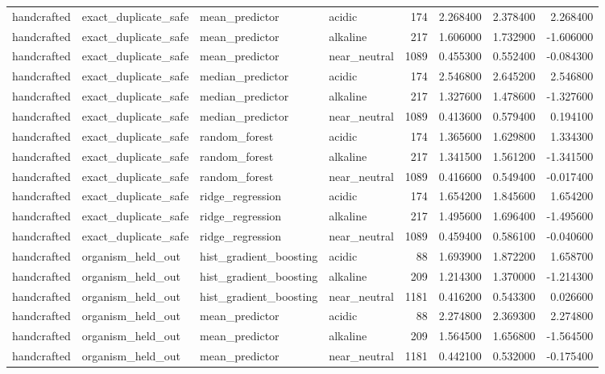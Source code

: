 \begin{longtable}{llllrrrr}
handcrafted & exact\_duplicate\_safe & mean\_predictor & acidic & 174 & 2.268400 & 2.378400 & 2.268400 \\
handcrafted & exact\_duplicate\_safe & mean\_predictor & alkaline & 217 & 1.606000 & 1.732900 & -1.606000 \\
handcrafted & exact\_duplicate\_safe & mean\_predictor & near\_neutral & 1089 & 0.455300 & 0.552400 & -0.084300 \\
handcrafted & exact\_duplicate\_safe & median\_predictor & acidic & 174 & 2.546800 & 2.645200 & 2.546800 \\
handcrafted & exact\_duplicate\_safe & median\_predictor & alkaline & 217 & 1.327600 & 1.478600 & -1.327600 \\
handcrafted & exact\_duplicate\_safe & median\_predictor & near\_neutral & 1089 & 0.413600 & 0.579400 & 0.194100 \\
handcrafted & exact\_duplicate\_safe & random\_forest & acidic & 174 & 1.365600 & 1.629800 & 1.334300 \\
handcrafted & exact\_duplicate\_safe & random\_forest & alkaline & 217 & 1.341500 & 1.561200 & -1.341500 \\
handcrafted & exact\_duplicate\_safe & random\_forest & near\_neutral & 1089 & 0.416600 & 0.549400 & -0.017400 \\
handcrafted & exact\_duplicate\_safe & ridge\_regression & acidic & 174 & 1.654200 & 1.845600 & 1.654200 \\
handcrafted & exact\_duplicate\_safe & ridge\_regression & alkaline & 217 & 1.495600 & 1.696400 & -1.495600 \\
handcrafted & exact\_duplicate\_safe & ridge\_regression & near\_neutral & 1089 & 0.459400 & 0.586100 & -0.040600 \\
handcrafted & organism\_held\_out & hist\_gradient\_boosting & acidic & 88 & 1.693900 & 1.872200 & 1.658700 \\
handcrafted & organism\_held\_out & hist\_gradient\_boosting & alkaline & 209 & 1.214300 & 1.370000 & -1.214300 \\
handcrafted & organism\_held\_out & hist\_gradient\_boosting & near\_neutral & 1181 & 0.416200 & 0.543300 & 0.026600 \\
handcrafted & organism\_held\_out & mean\_predictor & acidic & 88 & 2.274800 & 2.369300 & 2.274800 \\
handcrafted & organism\_held\_out & mean\_predictor & alkaline & 209 & 1.564500 & 1.656800 & -1.564500 \\
handcrafted & organism\_held\_out & mean\_predictor & near\_neutral & 1181 & 0.442100 & 0.532000 & -0.175400 \\

\end{longtable}
